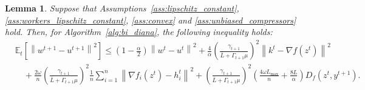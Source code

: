 \documentclass{article} %
\newcommand{\norm}[1]{\left\| #1 \right\|}
\newcommand{\ExpSub}[2]{{\mathbb{E}}_{#1}\left[#2\right]}
\theoremstyle{plain}
\newtheorem{lemma}[theorem]{Lemma}
\theoremstyle{definition}
\theoremstyle{remark}
\begin{document}
\begin{lemma}
  \label{lemma:bi_fast_diana_iterates}
  Suppose that Assumptions~\ref{ass:lipschitz_constant}, \ref{ass:workers_lipschitz_constant}, \ref{ass:convex} and \ref{ass:unbiased_compressors} hold. Then, for Algorithm~\ref{alg:bi_diana}, the following inequality holds:
  \begin{equation}
  \begin{aligned}
    \label{eq:bi_fast_diana_iterates}
    &\ExpSub{t}{\norm{w^{t+1} - u^{t+1}}^2} \leq \left(1 - \frac{\alpha}{2}\right) \norm{w^t - u^t}^2  + \frac{4}{\alpha} \left(\frac{\gamma_{t+1}}{\bar{L} + \Gamma_{t+1} \mu}\right)^2 \norm{k^t - \nabla f(z^{t})}^2 \\
  &\quad + \frac{2 \omega}{n} \left(\frac{\gamma_{t+1}}{\bar{L} + \Gamma_{t+1} \mu}\right)^2\frac{1}{n}\sum_{i=1}^n \norm{\nabla f_i(z^{t}) - h_i^t}^2 + \left(\frac{\gamma_{t+1}}{\bar{L} + \Gamma_{t+1} \mu}\right)^2\left(\frac{4 \omega L_{\max}}{n}  + \frac{8L}{\alpha}\right)D_f(z^t, y^{t+1}).
  \end{aligned}
  \end{equation}
\end{lemma}
\end{document}
